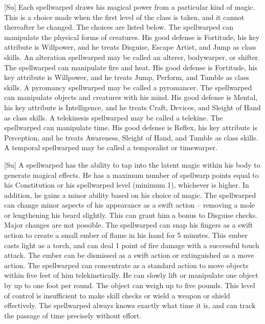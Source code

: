 [Su]
Each spellwarped draws his magical power from a particular kind of magic.
This is a choice made when the first level of the class is taken, and it cannot thereafter be changed.
The choices are listed below.
The spellwarped can manipulate the physical forms of creatures.
His good defense is Fortitude, his key attribute is Willpower, and he treats Disguise, Escape Artist, and Jump as class skills.
An alteration spellwarped may be called an alterer, bodywarper, or shifter.
The spellwarped can manipulate fire and heat.
His good defense is Fortitude, his key attribute is Willpower, and he treats Jump, Perform, and Tumble as class skills.
A pyromancy spellwarped may be called a pyromancer.
The spellwarped can manipulate objects and creatures with his mind.
His good defense is Mental, his key attribute is Intelligence, and he treats Craft, Devices, and Sleight of Hand as class skills.
A telekinesis spellwarped may be called a telekine.
The spellwarped can manipulate time.
His good defense is Reflex, his key attribute is Perception, and he treats Awareness, Sleight of Hand, and Tumble as class skills.
A temporal spellwarped may be called a temporalist or timewarper.

[Su]
A spellwarped has the ability to tap into the latent magic within his body to generate magical effects.
He has a maximum number of spellwarp points equal to his Constitution or his spellwarped level (minimum 1), whichever is higher.
In addition, he gains a minor ability based on his choice of magic.
The spellwarped can change minor aspects of his appearance as a swift action -- removing a mole or lengthening his beard slightly.
This can grant him a  bonus to Disguise checks.
Major changes are not possible.
The spellwarped can snap his fingers as a swift action to create a small ember of flame in his hand for 5 minutes.
This ember casts light as a torch, and can deal 1 point of fire damage with a successful touch attack.
The ember can be dismissed as a swift action or extinguished as a move action.
The spellwarped can concentrate as a standard action to move objects within five feet of him telekinetically.
He can slowly lift or manipulate one object by up to one foot per round.
The object can weigh up to five pounds.
This level of control is insufficient to make skill checks or wield a weapon or shield effectively.
The spellwarped always knows exactly what time it is, and can track the passage of time precisely without effort.

